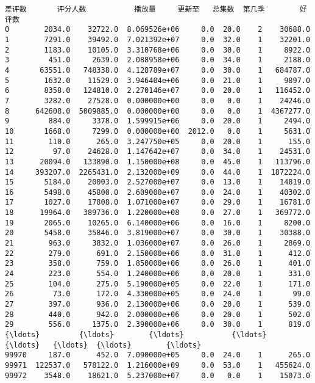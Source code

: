 \documentclass[11pt]{article}
\begin{document}
\begin{Verbatim}[commandchars=\\\{\}]
            差评数       评分人数           播放量     更新至   总集数  第几季        好评数  
0        2034.0    32722.0  8.069526e+06     0.0  20.0    2    30688.0  
1        7291.0    39492.0  7.021392e+07     0.0  32.0    1    32201.0  
2        1183.0    10105.0  3.310768e+06     0.0  30.0    1     8922.0  
3         451.0     2639.0  2.088958e+06     0.0  34.0    1     2188.0  
4       63551.0   748338.0  4.128789e+07     0.0  30.0    1   684787.0  
5        1632.0    11529.0  3.946404e+06     0.0  21.0    1     9897.0  
6        8358.0   124810.0  2.270146e+07     0.0  20.0    1   116452.0  
7        3282.0    27528.0  0.000000e+00     0.0   0.0    1    24246.0  
8      642608.0  5009885.0  0.000000e+00     0.0   0.0    1  4367277.0  
9         884.0     3378.0  1.599915e+06     0.0  20.0    1     2494.0  
10       1668.0     7299.0  0.000000e+00  2012.0   0.0    1     5631.0  
11        110.0      265.0  3.247750e+05     0.0  20.0    1      155.0  
12         97.0    24628.0  1.147642e+07     0.0  34.0    1    24531.0  
13      20094.0   133890.0  1.150000e+08     0.0  45.0    1   113796.0  
14     393207.0  2265431.0  2.132000e+09     0.0  44.0    1  1872224.0  
15       5184.0    20003.0  2.527000e+07     0.0  13.0    1    14819.0  
16       5498.0    45800.0  2.609000e+07     0.0  24.0    1    40302.0  
17       1027.0    17808.0  1.071000e+07     0.0  29.0    1    16781.0  
18      19964.0   389736.0  1.220000e+08     0.0  27.0    1   369772.0  
19       2065.0    10265.0  6.140000e+06     0.0  16.0    1     8200.0  
20       5458.0    35846.0  3.819000e+07     0.0  30.0    1    30388.0  
21        963.0     3832.0  1.036000e+07     0.0  26.0    1     2869.0  
22        279.0      691.0  2.150000e+06     0.0  31.0    1      412.0  
23        358.0      759.0  1.850000e+06     0.0  26.0    1      401.0  
24        223.0      554.0  1.240000e+06     0.0  20.0    1      331.0  
25        104.0      275.0  5.190000e+05     0.0  22.0    1      171.0  
26         73.0      172.0  4.330000e+05     0.0  24.0    1       99.0  
27        397.0      936.0  2.130000e+06     0.0  20.0    1      539.0  
28        440.0      942.0  2.000000e+06     0.0  20.0    1      502.0  
29        556.0     1375.0  2.390000e+06     0.0  30.0    1      819.0  
{\ldots}         {\ldots}        {\ldots}           {\ldots}     {\ldots}   {\ldots}  {\ldots}        {\ldots}  
99970     187.0      452.0  7.090000e+05     0.0  24.0    1      265.0  
99971  122537.0   578122.0  1.216000e+09     0.0  53.0    1   455624.0  
99972    3548.0    18621.0  5.237000e+07     0.0   0.0    1    15073.0  

\end{Verbatim}
\end{document}
